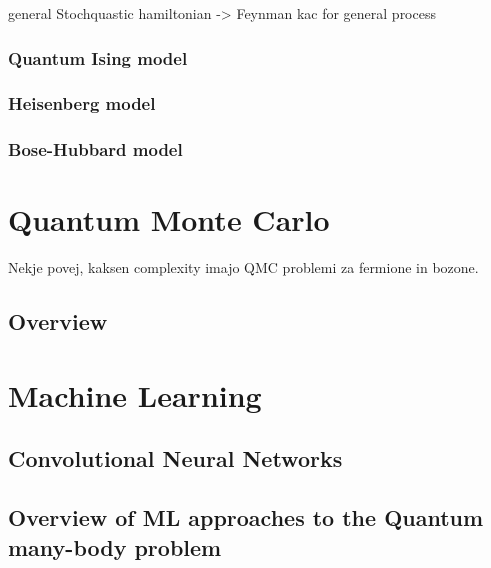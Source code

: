 general Stochquastic hamiltonian -> Feynman kac for general process

\subsubsection{Quantum Ising model}
\subsubsection{Heisenberg model}
\subsubsection{Bose-Hubbard model}


\newpage
\section{Quantum Monte Carlo}
\label{sec:qmc}

Nekje povej, kaksen complexity imajo QMC problemi za fermione in bozone. 

\subsection{Overview}
\label{subsec:qmc-overview}

\newpage
\section{Machine Learning}
\label{sec:ml}

\subsection{Convolutional Neural Networks}
\label{subsec:ml-cnn}

\subsection{Overview of ML approaches to the Quantum many-body problem}
\label{subsec:ml-overview}
